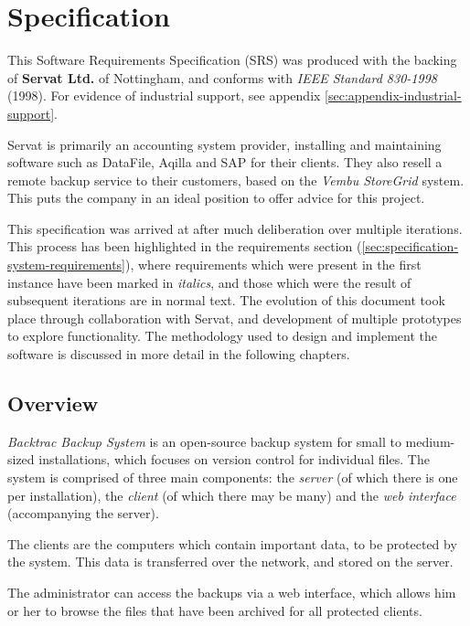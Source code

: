 \chapter{Specification}
\label{chap:specification}

This Software Requirements Specification (SRS) was produced with the backing of
\textbf{Servat Ltd.} of Nottingham, and conforms with \emph{IEEE Standard
830-1998} (1998). For evidence of industrial support, see appendix
\ref{sec:appendix-industrial-support}.

Servat is primarily an accounting system provider, installing and maintaining
software such as DataFile, Aqilla and SAP for their clients. They also resell
a remote backup service to their customers, based on the \emph{Vembu StoreGrid}
system. This puts the company in an ideal position to offer advice for this
project.

This specification was arrived at after much deliberation over multiple
iterations. This process has been highlighted in the requirements section
(\ref{sec:specification-system-requirements}), where requirements which were
present in the first instance have been marked in \emph{italics}, and those
which were the result of subsequent iterations are in normal text. The
evolution of this document took place through collaboration with Servat, and
development of multiple prototypes to explore functionality. The methodology
used to design and implement the software is discussed in more detail in the
following chapters.

\section{Overview}

\emph{Backtrac Backup System} is an open-source backup system for small to
medium-sized installations, which focuses on version control for individual
files. The system is comprised of three main components: the \emph{server} (of
which there is one per installation), the \emph{client} (of which there may be
many) and the \emph{web interface} (accompanying the server).

The clients are the computers which contain important data, to be protected by
the system. This data is transferred over the network, and stored on the
server.

The administrator can access the backups via a web interface, which allows him
or her to browse the files that have been archived for all protected clients.


